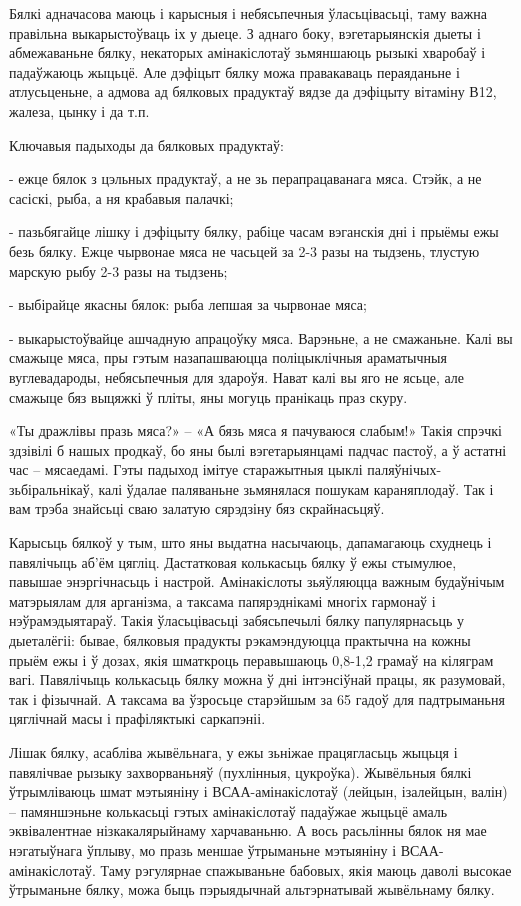 Бялкі адначасова маюць і карысныя і небясьпечныя ўласьцівасьці, таму важна правільна выкарыстоўваць іх у дыеце. З аднаго боку, вэгетарыянскія дыеты і абмежаваньне бялку, некаторых амінакіслотаў зьмяншаюць рызыкі хваробаў і падаўжаюць жыцьцё. Але дэфіцыт бялку можа правакаваць пераяданьне і атлусьценьне, а адмова ад бялковых прадуктаў вядзе да дэфіцыту вітаміну В12, жалеза, цынку і да т.п.

Ключавыя падыходы да бялковых прадуктаў:

- ежце бялок з цэльных прадуктаў, а не зь перапрацаванага мяса. Стэйк, а не сасіскі, рыба, а ня крабавыя палачкі;

- пазьбягайце лішку і дэфіцыту бялку, рабіце часам вэганскія дні і прыёмы ежы безь бялку. Ежце чырвонае мяса не часьцей за 2-3 разы на тыдзень, тлустую марскую рыбу 2-3 разы на тыдзень;

- выбірайце якасны бялок: рыба лепшая за чырвонае мяса;

- выкарыстоўвайце ашчадную апрацоўку мяса. Варэньне, а не смажаньне. Калі вы смажыце мяса, пры гэтым назапашваюцца поліцыклічныя араматычныя вуглевадароды, небясьпечныя для здароўя. Нават калі вы яго не ясьце, але смажыце бяз выцяжкі ў пліты, яны могуць пранікаць праз скуру.

«Ты дражлівы празь мяса?» – «А бязь мяса я пачуваюся слабым!» Такія спрэчкі здзівілі б нашых продкаў, бо яны былі вэгетарыянцамі падчас пастоў, а ў астатні час – мясаедамі. Гэты падыход імітуе старажытныя цыклі паляўнічых-зьбіральнікаў, калі ўдалае паляваньне зьмянялася пошукам караняплодаў. Так і вам трэба знайсьці сваю залатую сярэдзіну бяз скрайнасьцяў.

Карысьць бялкоў у тым, што яны выдатна насычаюць, дапамагаюць схуднець і павялічыць аб'ём цягліц. Дастатковая колькасьць бялку ў ежы стымулюе, павышае энэргічнасьць і настрой. Амінакіслоты зьяўляюцца важным будаўнічым матэрыялам для арганізма, а таксама папярэднікамі многіх гармонаў і нэўрамэдыятараў. Такія ўласьцівасьці забясьпечылі бялку папулярнасьць у дыеталёгіі: бывае, бялковыя прадукты рэкамэндуюцца практычна на кожны прыём ежы і ў дозах, якія шматкроць перавышаюць 0,8-1,2 грамаў на кіляграм вагі. Павялічыць колькасьць бялку можна ў дні інтэнсіўнай працы, як разумовай, так і фізычнай. А таксама ва ўзросьце старэйшым за 65 гадоў для падтрыманьня цяглічнай масы і прафіляктыкі саркапэніі.

Лішак бялку, асабліва жывёльнага, у ежы зьніжае працягласьць жыцьця і павялічвае рызыку захворваньняў (пухлінныя, цукроўка). Жывёльныя бялкі ўтрымліваюць шмат мэтыяніну і ВСАА-амінакіслотаў (лейцын, ізалейцын, валін) – памяншэньне колькасьці гэтых амінакіслотаў падаўжае жыцьцё амаль эквівалентнае нізкакалярыйнаму харчаваньню. А вось расьлінны бялок ня мае нэгатыўнага ўплыву, мо празь меншае ўтрыманьне мэтыяніну і ВСАА-амінакіслотаў. Таму рэгулярнае спажываньне бабовых, якія маюць даволі высокае ўтрыманьне бялку, можа быць пэрыядычнай альтэрнатывай жывёльнаму бялку.

